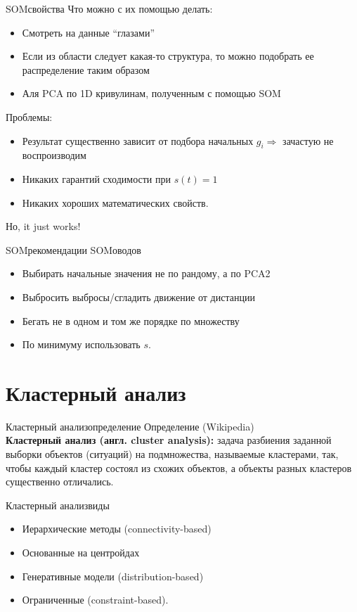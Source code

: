 \documentclass[14pt, fleqn, xcolor={dvipsnames, table}]{beamer}
\begin{document}
\begin{frame}{SOM}{свойства}
Что можно с их помощью делать:
\begin{itemize}
  \item Смотреть на данные ``глазами''
  \item Если из области следует какая-то структура, то можно подобрать ее распределение таким образом
  \item Аля PCA по 1D кривулинам, полученным с помощью SOM
\end{itemize}
Проблемы:
\begin{itemize}
  \item Результат существенно зависит от подбора начальных $g_i \Rightarrow$ зачастую не воспроизводим
  \item Никаких гарантий сходимости при $s(t) = 1$
  \item Никаких хороших математических свойств.
\end{itemize}
Но, it just works!
\end{frame}

\begin{frame}{SOM}{рекомендации SOMоводов}
\begin{itemize}
  \item Выбирать начальные значения не по рандому, а по PCA2
  \item Выбросить выбросы/сгладить движение от дистанции
  \item Бегать не в одном и том же порядке по множеству
  \item По минимуму использовать $s$.
\end{itemize}
\end{frame}

\section{Кластерный анализ}

\begin{frame}{Кластерный анализ}{определение}
{\color{blue}Определение (Wikipedia)} \\
\italic
\textbf{Кластерный анализ (англ. cluster analysis): }задача разбиения заданной выборки объектов (ситуаций) на подмножества, называемые кластерами, так, чтобы каждый кластер состоял из схожих объектов, а объекты разных кластеров существенно отличались.
\end{frame}

\begin{frame}{Кластерный анализ}{виды}
\begin{itemize}
  \item Иерархические методы (connectivity-based)
  \item Основанные на центройдах
  \item Генеративные модели (distribution-based)
  \item Ограниченные (constraint-based).
\end{itemize}
\end{frame}
\end{document}
